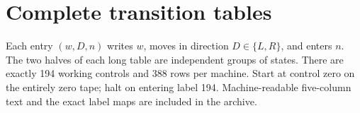 \documentclass[11pt,letterpaper]{article}
\theoremstyle{definition}
\begin{document}
\clearpage
\appendix
\section{Complete transition tables}
\label{app:tables}
Each entry $(w,D,n)$ writes $w$, moves in direction $D\in\{L,R\}$, and
enters $n$. The two halves of each long table are independent groups of
states. There are exactly 194 working controls and 388 rows per machine.
Start at control zero on the entirely zero tape; halt on entering label
194. Machine-readable five-column text and the exact label maps are
included in the archive.

\end{document}
